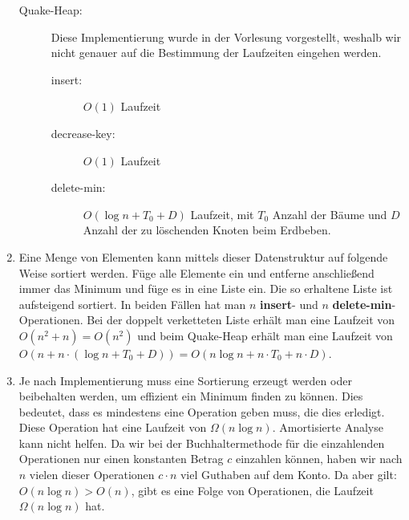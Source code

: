 \documentclass[a4paper,10pt]{article}
\begin{document}
\begin{enumerate}
\begin{description}
	\item[Quake-Heap:] Diese Implementierung wurde in der Vorlesung vorgestellt, weshalb wir nicht genauer auf die Bestimmung der Laufzeiten eingehen werden.
	\begin{description}
		\item[insert:]$O(1)$ Laufzeit
		\item[decrease-key:]$O(1)$ Laufzeit
		\item[delete-min:]$O(\log n + T_0 + D)$ Laufzeit, mit $T_0$ Anzahl der Bäume und $D$ Anzahl der zu löschenden Knoten beim Erdbeben.
	\end{description}
\end{description}
\item   Eine Menge von Elementen kann mittels dieser Datenstruktur auf folgende Weise sortiert werden. Füge alle Elemente ein und entferne anschließend immer das Minimum und füge es in eine Liste ein. Die so erhaltene Liste ist aufsteigend sortiert.
In beiden Fällen hat man $n$ \textbf{insert}- und $n$ \textbf{delete-min}-Operationen. Bei der doppelt verketteten Liste erhält man eine Laufzeit von $O(n^2 + n) = O(n^2)$ und beim Quake-Heap erhält man eine Laufzeit von $O(n + n\cdot (\log n + T_0 + D)) = O(n \log n + n\cdot T_0 + n \cdot D)$.
\item   Je nach Implementierung muss eine Sortierung erzeugt werden oder beibehalten werden, um effizient ein Minimum finden zu können. Dies bedeutet, dass es mindestens eine Operation geben muss, die dies erledigt. Diese Operation hat eine Laufzeit von $\Omega (n \log n)$. Amortisierte Analyse kann nicht helfen. Da wir bei der Buchhaltermethode für die einzahlenden Operationen nur einen konstanten Betrag $c$ einzahlen können, haben wir nach $n$ vielen dieser Operationen $c \cdot n$ viel Guthaben auf dem Konto. Da aber gilt: $O(n \log n) > O(n)$, gibt es eine Folge von Operationen, die Laufzeit $\Omega (n \log n)$ hat.
\end{enumerate}
\end{document}
